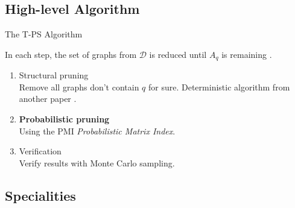 \documentclass[10pt, aspectratio=149]{beamer}
\begin{document}
\subsection{High-level Algorithm}

\begin{frame}{The T-PS Algorithm}

In each step, the set of graphs from $\mathcal{D}$ is reduced until $A_q$ is remaining \cite{sim}.

\begin{enumerate}
    \item Structural pruning \\ 
    Remove all graphs don't contain $q$ for sure. Deterministic algorithm from another paper \cite{structural}.
    
    \item \textbf{Probabilistic pruning}  \\
    Using the PMI \textit{Probabilistic Matrix Index}.
    
    \item Verification \\
    Verify results with Monte Carlo sampling.
\end{enumerate}
\end{frame}


\subsection{Specialities}
\end{document}
